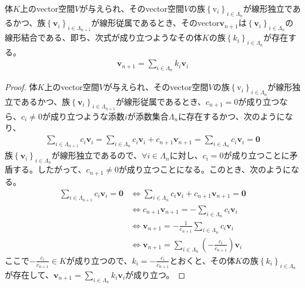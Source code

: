 \documentclass[dvipdfmx]{jsarticle}
\begin{document}
\begin{thm}\label{2.1.1.15}
体$K$上のvector空間$V$が与えられ、そのvector空間$V$の族$\left\{ \mathrm{v}_i \right\}_{i\in \varLambda_n } $が線形独立であるかつ、族$\left\{ \mathbf{v}_i \right\}_{i \in \varLambda_{n + 1} } $が線形従属であるとき、そのvector$\mathbf{v}_{n + 1}$は$\left\{ \mathbf{v}_i \right\}_{i \in \varLambda_{n} } $の線形結合である、即ち、次式が成り立つようなその体$K$の族$\left\{ k_{i} \right\}_{i \in \varLambda_{n}}$が存在する。
\begin{align*}
\mathbf{v}_{n + 1} = \sum_{i \in \varLambda_{n}} {k_{i}\mathbf{v}_{i}}
\end{align*}
\end{thm}
\begin{proof}
体$K$上のvector空間$V$が与えられ、そのvector空間$V$の族$\left\{ \mathrm{v}_i \right\}_{i\in \varLambda_n } $が線形独立であるかつ、族$\left\{ \mathbf{v}_i \right\}_{i \in \varLambda_{n + 1} } $が線形従属であるとき、$c_{n + 1} = 0$が成り立つなら、$c_{i} \neq 0$が成り立つような添数$i$が添数集合$\varLambda_{n}$に存在するかつ、次のようになり、
\begin{align*}
\sum_{i \in \varLambda_{n + 1}} {c_{i}\mathbf{v}_{i}} = \sum_{i \in \varLambda_{n}} {c_{i}\mathbf{v}_{i}} + c_{n + 1}\mathbf{v}_{n + 1} = \sum_{i \in \varLambda_{n}} {c_{i}\mathbf{v}_{i}} = \mathbf{0}
\end{align*}
族$\left\{ \mathbf{v}_i \right\}_{i\in \varLambda_n } $が線形独立であるので、$\forall i \in \varLambda_{n}$に対し、$c_{i} = 0$が成り立つことに矛盾する。したがって、$c_{n + 1} \neq 0$が成り立つことになる。このとき、次のようになる。
\begin{align*}
\sum_{i \in \varLambda_{n + 1}} {c_{i}\mathbf{v}_{i}} = \mathbf{0} &\Leftrightarrow \sum_{i \in \varLambda_{n}} {c_{i}\mathbf{v}_{i}} + c_{n + 1}\mathbf{v}_{n + 1} = \mathbf{0} \\
&\Leftrightarrow c_{n + 1}\mathbf{v}_{n + 1} = - \sum_{i \in \varLambda_{n}} {c_{i}\mathbf{v}_{i}} \\
&\Leftrightarrow \mathbf{v}_{n + 1} = - \frac{1}{c_{n + 1}}\sum_{i \in \varLambda_{n}} {c_{i}\mathbf{v}_{i}} \\
&\Leftrightarrow \mathbf{v}_{n + 1} = \sum_{i \in \varLambda_{n}} {\left( - \frac{c_{i}}{c_{n + 1}} \right)\mathbf{v}_{i}}
\end{align*}
ここで$- \frac{c_{i}}{c_{n + 1}} \in K$が成り立つので、$k_{i} = - \frac{c_{i}}{c_{n + 1}}$とおくと、その体$K$の族$\left\{ k_{i} \right\}_{i \in \varLambda_{n}}$が存在して、$\mathbf{v}_{n + 1} = \sum_{i \in \varLambda_{n}} {k_{i}\mathbf{v}_{i}}$が成り立つ。
\end{proof}
\end{document}
